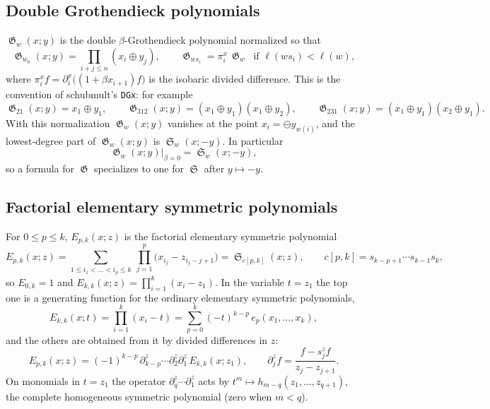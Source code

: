 \documentclass{amsart}
\theoremstyle{definition}
\theoremstyle{remark}
\DeclareMathOperator{\sch}{\mathfrak{S}}
\DeclareMathOperator{\groth}{\mathfrak{G}}
\newcommand{\fgl}{\oplus}
\newcommand{\fgn}{\ominus}
\newcommand{\schubmult}{\textsf{schubmult}}
\newcommand{\pyid}[1]{\texttt{#1}}
\begin{document}
\subsection*{Double Grothendieck polynomials}
$\groth_w(x;y)$ is the double $\beta$-Grothendieck polynomial \cite{fomin1994grothendieck}
normalized so that
\[
\groth_{w_0}(x;y) = \prod_{i+j\le n}(x_i \fgl y_j),
\qquad
\groth_{ws_i} = \pi_i^x\,\groth_w \ \text{ if } \ell(ws_i)<\ell(w),
\]
where $\pi_i^x f = \partial_i^x\bigl((1+\beta x_{i+1}) f\bigr)$ is the isobaric divided
difference. This is the convention of \schubmult's \pyid{DGx}: for example
\[
\groth_{21}(x;y) = x_1\fgl y_1,\qquad
\groth_{312}(x;y) = (x_1\fgl y_1)(x_1\fgl y_2),\qquad
\groth_{231}(x;y) = (x_1\fgl y_1)(x_2\fgl y_1).
\]
With this normalization $\groth_w(x;y)$ vanishes at the point $x_i = \fgn y_{w(i)}$, and the
lowest-degree part of $\groth_w(x;y)$ is $\sch_w(x;-y)$. In particular
\begin{equation}\label{eq:beta0}
\groth_w(x;y)\big|_{\beta=0} = \sch_w(x;-y),
\end{equation}
so a formula for $\groth$ specializes to one for $\sch$ after $y\mapsto -y$.

\subsection*{Factorial elementary symmetric polynomials}
For $0\le p\le k$, $E_{p,k}(x;z)$ is the factorial elementary symmetric polynomial
\[
E_{p,k}(x;z) = \sum_{1\le i_1<\dots<i_p\le k}\ \prod_{j=1}^{p}\bigl(x_{i_j} - z_{i_j-j+1}\bigr)
= \sch_{c[p,k]}(x;z),
\qquad c[p,k] = s_{k-p+1}\cdots s_{k-1}s_k,
\]
so $E_{0,k}=1$ and $E_{k,k}(x;z) = \prod_{i=1}^{k}(x_i - z_1)$. In the variable $t=z_1$ the top
one is a generating function for the ordinary elementary symmetric polynomials,
\begin{equation}\label{eq:top-gen}
E_{k,k}(x;t) = \prod_{i=1}^{k}(x_i - t) = \sum_{p=0}^{k} (-t)^{k-p}\,e_p(x_1,\dots,x_k),
\end{equation}
and the others are obtained from it by divided differences in $z$:
\begin{equation}\label{eq:E-from-top}
E_{p,k}(x;z) = (-1)^{k-p}\,\partial^{z}_{k-p}\cdots\partial^{z}_{2}\partial^{z}_{1}\,E_{k,k}(x;z_1),
\qquad
\partial^z_{j} f = \frac{f - s^z_j f}{z_j - z_{j+1}}.
\end{equation}
On monomials in $t=z_1$ the operator $\partial^z_{q}\cdots\partial^z_1$ acts by
$t^m \mapsto h_{m-q}(z_1,\dots,z_{q+1})$, the complete homogeneous symmetric polynomial
(zero when $m<q$).
\end{document}
